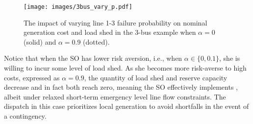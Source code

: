 \begin{figure}
    \centering
    \texttt{[image: images/3bus\_vary\_p.pdf]}
    \caption{The impact of varying line 1-3 failure probability on nominal generation cost and load shed in the 3-bus example when $\alpha = 0$ (solid) and $\alpha=0.9$ (dotted).}
    \label{fig:3bus_vary_p}
\end{figure}

Notice that when the SO has lower risk aversion, i.e., when $\alpha\in\{0,0.1\}$, she is willing to incur some level of load shed. As she becomes more risk-averse to high costs, expressed as $\alpha=0.9$, the quantity of load shed and reserve capacity decrease and in fact both reach zero, meaning the SO effectively implements \PSCED{}, albeit under relaxed short-term emergency level line flow constraints. The dispatch in this case prioritizes local generation to avoid shortfalls in the event of a contingency.

